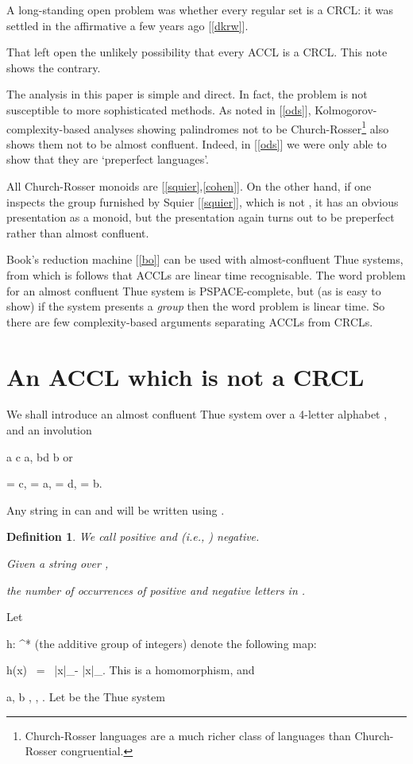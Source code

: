 \documentclass[12pt,a4paper]{article}
\newtheorem{definition}[theorem]{Definition}
\numberwithin{equation}{section}
\newcommand{\pos}{{\text{\rm pos}}}
\renewcommand{\neg}{{\text{\rm neg}}}
\newcommand{\be}{}
\begin{document}
A long-standing open problem was
whether every regular set is a CRCL:  it was
settled in the affirmative a few years ago
[\ref{dkrw}].

That left open the unlikely possibility
that every ACCL is a CRCL.  This note shows
the contrary.

The analysis in this paper is simple and direct.
In fact, the problem is not susceptible to more
sophisticated methods.  As noted in [\ref{ods}],
Kolmogorov-complexity-based analyses showing
palindromes not to be Church-Rosser\footnote{Church-Rosser
languages are a much richer class of languages than
Church-Rosser congruential.} also shows them not
to be almost confluent.  Indeed, in [\ref{ods}] we were only able to
show that they are `preperfect languages'.

All Church-Rosser monoids  are  [\ref{squier},\ref{cohen}].
On the other hand, if one inspects
the group furnished by Squier [\ref{squier}],
which is not , it has an obvious presentation
as a monoid, but the presentation again turns out to be
preperfect rather than almost confluent.

Book's reduction machine [\ref{bo}]
can be used with almost-confluent Thue systems,
from which is follows that ACCLs are linear time recognisable.
The word problem for
an almost confluent Thue system is PSPACE-complete, but
(as is easy to show) if the
system presents a {\em group} then the word problem is linear time.
So there are few complexity-based arguments separating
ACCLs from CRCLs.

\section{An ACCL which is not a CRCL}

We shall introduce an almost confluent Thue system over
a 4-letter alphabet
, and
an involution
\be
a \mapsto c \mapsto a,\quad
b\mapsto d \mapsto b
\ee
or
\be
{} = c,  = a,
 = d,  = b.
\ee

\noindent Any string in 
can and will be written using .
\begin{definition}
We call  {\em positive} and  (i.e.,
) {\em negative}.

Given a string  over ,


the number of occurrences of positive and negative
letters in .
\end{definition}

Let
\be
h: \Sigma^* \to \IZ
\ee (the additive group of integers) denote the following map:
\be
h(x) ~=~
|x|_\pos - |x|_\neg .
\ee
This is a homomorphism, and
\be
a, b ,
, .
\ee
Let  be the Thue system
\end{document}
